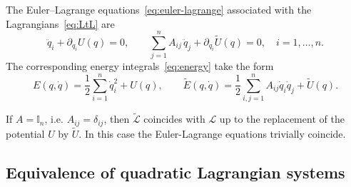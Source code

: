 \documentclass{rendiconti}
\begin{document}
The Euler--Lagrange equations~\eqref{eq:euler-lagrange} associated with the
Lagrangians~\eqref{eq:LtL} are
\begin{equation}
\label{eq:LtLequations}
\ddot q_i + \partial_{q_i} U(q) = 0,
\qquad
\sum_{j=1}^n A_{ij}\,\ddot q_j + \partial_{q_i} \widetilde U(q) = 0,
\quad
i=1,\dots,n.
\end{equation}
The corresponding energy integrals~\eqref{eq:energy} take the form
\begin{equation}
\label{eq:LtLenergy}
E(q,\dot q)
=
\frac{1}{2} \sum_{i=1}^n \dot q_i^2 + U(q),
\qquad
\widetilde E(q,\dot q)
=
\frac{1}{2} \sum_{i,j=1}^n A_{ij} \dot q_i \dot q_j + \widetilde U(q).
\end{equation}

\begin{remark}
If $A=\mathbb I_n$, i.e. $A_{ij}=\delta_{ij}$, then $\widetilde{\mathcal L}$ coincides with
$\mathcal L$ up to the replacement of the potential $U$ by $\widetilde U$.
In this case the Euler-Lagrange equations trivially coincide.
\end{remark}


\subsection{Equivalence of quadratic Lagrangian systems}
\label{sec:nnn}
\end{document}
